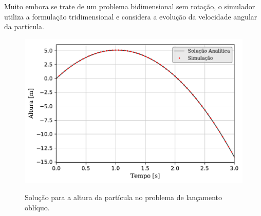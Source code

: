 Muito embora se trate de um problema bidimensional sem rotação, o simulador utiliza a formulação tridimensional e considera a evolução da velocidade angular da partícula.

\begin{figure}[htb!]
	\caption{Solução para a altura da partícula no problema de lançamento oblíquo\protect\footnotemark.}
	\centering
		\includegraphics[scale=1]{images/falling_sphere/correct_initial_acceleration/y_position.pdf}
	\label{fig:falling_sphere_y_position}
	\sourceMe
\end{figure}


